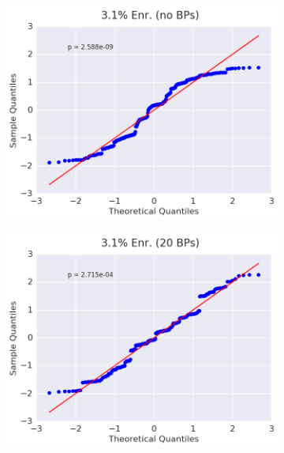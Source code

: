 \begin{figure}[h!]
\centering
\begin{subfigure}{0.5\textwidth}
  \centering
  \includegraphics[width=\linewidth]{figures/patterns/assm-3.1/quantile/assm-31-fiss-2}
  \caption{}
  \label{fig:chap9-qq-assm-3.1-fiss}
\end{subfigure}%
\begin{subfigure}{0.5\textwidth}
  \centering
  \includegraphics[width=\linewidth]{figures/patterns/assm-3.1-20BPs/quantile/assm-31-20BPs-fiss-2}
  \caption{}
  \label{fig:chap9-qq-assm-3.1-20BPs-fiss}
\end{subfigure}
\begin{subfigure}{0.5\textwidth}

\end{subfigure}
\end{figure}

